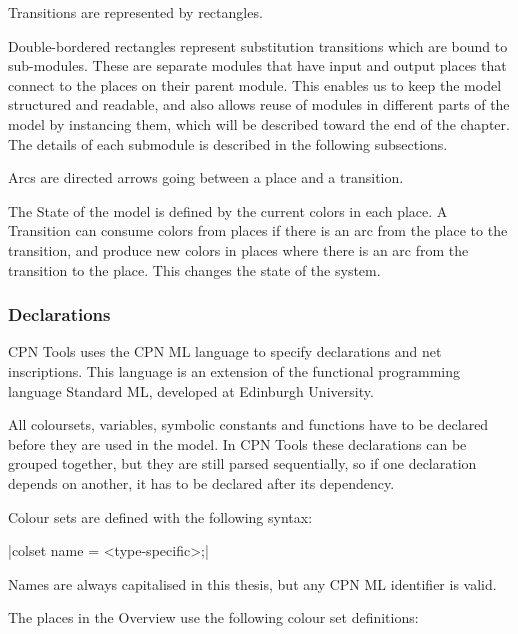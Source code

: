 	Transitions are represented by rectangles. 
	
	Double-bordered rectangles represent substitution transitions which are bound
	to sub-modules. These are separate modules that have input and output places
	that connect to the places on their parent module. This enables us to keep
	the model structured and readable, and also allows reuse of modules in
	different parts of the model by instancing them, which will be described toward
	the end of the chapter. The details of each submodule is described in the
	following subsections.
	
	Arcs are directed arrows going between a place and a transition.
	
	The State of the model is defined by the current colors in
	each place. A Transition can consume colors from places if there is an arc from
	the place to the transition, and produce new colors in places where there is an
	arc from the transition to the place. This changes the state of the system.
	
	
	\subsubsection{Declarations}
	
	CPN Tools uses the CPN ML language to specify declarations and net inscriptions.
	This language is an extension of the functional programming language Standard
	ML, developed at Edinburgh University.
	
	All coloursets, variables, symbolic constants and functions have to be declared
	before they are used in the model. In CPN Tools these declarations can be
	grouped together, but they are still parsed sequentially, so if one declaration
	depends on another, it has to be declared after its dependency.

	Colour sets are defined with the following syntax:
	
	|colset name = <type-specific>;|
	
	Names are always capitalised in this thesis, but any CPN ML identifier is
	valid.
	
	The places in the Overview use the following colour set definitions:
	
